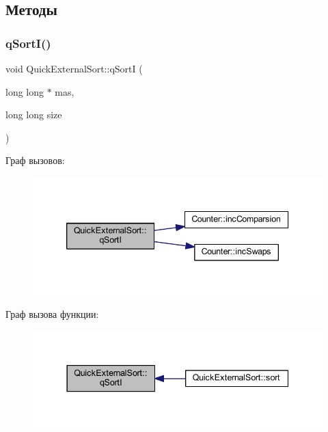 \subsection{Методы}
\hypertarget{class_quick_external_sort_a912abb7f2ccdadd7d97992f035e16183}{}\label{class_quick_external_sort_a912abb7f2ccdadd7d97992f035e16183} 
\subsubsection{\texorpdfstring{q\+Sort\+I()}{qSortI()}}
{\footnotesize\ttfamily void Quick\+External\+Sort\+::q\+SortI (\begin{DoxyParamCaption}\item[{long long $\ast$}]{mas,  }\item[{long long}]{size }\end{DoxyParamCaption})\hspace{0.3cm}{\ttfamily [private]}}

Граф вызовов\+:\nopagebreak
\begin{figure}[H]
\begin{center}
\leavevmode
\includegraphics[width=339pt]{class_quick_external_sort_a912abb7f2ccdadd7d97992f035e16183_cgraph}
\end{center}
\end{figure}
Граф вызова функции\+:\nopagebreak
\begin{figure}[H]
\begin{center}
\leavevmode
\includegraphics[width=337pt]{class_quick_external_sort_a912abb7f2ccdadd7d97992f035e16183_icgraph}
\end{center}
\end{figure}
\hypertarget{class_quick_external_sort_adafdd4faded04218c1a131bf55e3c90d}{}\label{class_quick_external_sort_adafdd4faded04218c1a131bf55e3c90d} 
